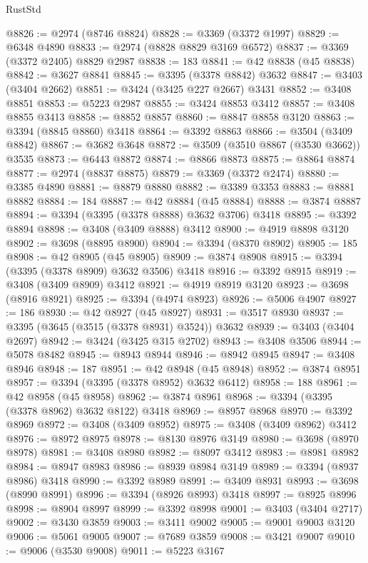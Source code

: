 \begin{lexlean}{RustStd}
\begin{coremodule}
@8826 := @2974 (@8746 @8824)
@8828 := @3369 (@3372 @1997)
@8829 := @6348 @4890
@8833 := @2974 (@8828 @8829 @3169 @6572)
@8837 := @3369 (@3372 @2405) @8829 @2987
@8838 := 183
@8841 := @42 @8838 (@45 @8838)
@8842 := @3627 @8841
@8845 := @3395 (@3378 @8842) @3632
@8847 := @3403 (@3404 @2662)
@8851 := @3424 (@3425 @227 @2667) @3431
@8852 := @3408 @8851
@8853 := @5223 @2987
@8855 := @3424 @8853 @3412
@8857 := @3408 @8855 @3413
@8858 := @8852 @8857
@8860 := @8847 @8858 @3120
@8863 := @3394 (@8845 @8860) @3418
@8864 := @3392 @8863
@8866 := @3504 (@3409 @8842)
@8867 := @3682 @3648
@8872 := @3509 (@3510 @8867 (@3530 @3662)) @3535
@8873 := @6443 @8872
@8874 := @8866 @8873
@8875 := @8864 @8874
@8877 := @2974 (@8837 @8875)
@8879 := @3369 (@3372 @2474)
@8880 := @3385 @4890
@8881 := @8879 @8880
@8882 := @3389 @3353
@8883 := @8881 @8882
@8884 := 184
@8887 := @42 @8884 (@45 @8884)
@8888 := @3874 @8887
@8894 := @3394 (@3395 (@3378 @8888) @3632 @3706) @3418
@8895 := @3392 @8894
@8898 := @3408 (@3409 @8888) @3412
@8900 := @4919 @8898 @3120
@8902 := @3698 (@8895 @8900)
@8904 := @3394 (@8370 @8902)
@8905 := 185
@8908 := @42 @8905 (@45 @8905)
@8909 := @3874 @8908
@8915 := @3394 (@3395 (@3378 @8909) @3632 @3506) @3418
@8916 := @3392 @8915
@8919 := @3408 (@3409 @8909) @3412
@8921 := @4919 @8919 @3120
@8923 := @3698 (@8916 @8921)
@8925 := @3394 (@4974 @8923)
@8926 := @5006 @4907
@8927 := 186
@8930 := @42 @8927 (@45 @8927)
@8931 := @3517 @8930
@8937 := @3395 (@3645 (@3515 (@3378 @8931) @3524)) @3632
@8939 := @3403 (@3404 @2697)
@8942 := @3424 (@3425 @315 @2702)
@8943 := @3408 @3506
@8944 := @5078 @8482
@8945 := @8943 @8944
@8946 := @8942 @8945
@8947 := @3408 @8946
@8948 := 187
@8951 := @42 @8948 (@45 @8948)
@8952 := @3874 @8951
@8957 := @3394 (@3395 (@3378 @8952) @3632 @6412)
@8958 := 188
@8961 := @42 @8958 (@45 @8958)
@8962 := @3874 @8961
@8968 := @3394 (@3395 (@3378 @8962) @3632 @8122) @3418
@8969 := @8957 @8968
@8970 := @3392 @8969
@8972 := @3408 (@3409 @8952)
@8975 := @3408 (@3409 @8962) @3412
@8976 := @8972 @8975
@8978 := @8130 @8976 @3149
@8980 := @3698 (@8970 @8978)
@8981 := @3408 @8980
@8982 := @8097 @3412
@8983 := @8981 @8982
@8984 := @8947 @8983
@8986 := @8939 @8984 @3149
@8989 := @3394 (@8937 @8986) @3418
@8990 := @3392 @8989
@8991 := @3409 @8931
@8993 := @3698 (@8990 @8991)
@8996 := @3394 (@8926 @8993) @3418
@8997 := @8925 @8996
@8998 := @8904 @8997
@8999 := @3392 @8998
@9001 := @3403 (@3404 @2717)
@9002 := @3430 @3859
@9003 := @3411 @9002
@9005 := @9001 @9003 @3120
@9006 := @5061 @9005
@9007 := @7689 @3859
@9008 := @3421 @9007
@9010 := @9006 (@3530 @9008)
@9011 := @5223 @3167

\end{coremodule}
\end{lexlean}
